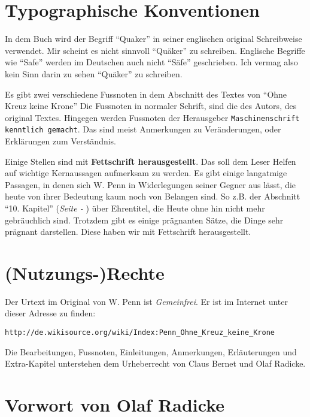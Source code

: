 \chapter{Typographische Konventionen}

In dem Buch wird der Begriff "`Quaker"'  in seiner
englischen original Schreibweise verwendet. Mir scheint es nicht sinnvoll
"`Quäker"' zu schreiben. Englische Begriffe wie "`Safe"' werden im Deutschen
auch nicht "`Säfe"' geschrieben. Ich vermag also kein Sinn darin zu sehen
"`Quäker"' zu schreiben.

\medskip

Es gibt zwei verschiedene Fussnoten in dem Abschnitt des Textes von "`Ohne Kreuz
keine Krone"' Die Fussnoten in normaler Schrift, sind die des Autors, des
original Textes. Hingegen werden Fussnoten der Herausgeber
\texttt{Maschinenschrift kenntlich gemacht}. Das sind meist Anmerkungen zu
Veränderungen, oder Erklärungen zum Verständnis.

\medskip

Einige Stellen sind mit \textbf{Fettschrift herausgestellt}. Das soll dem Leser
Helfen auf wichtige Kernaussagen aufmerksam zu werden. Es gibt einige langatmige
Passagen, in denen sich W. Penn in Widerlegungen seiner Gegner aus lässt, die
heute von ihrer Bedeutung kaum noch von Belangen sind. So z.B. der Abschnitt
"`10. Kapitel"' (\textit{Seite \pageref{kap10} - \pageref{kap10_ende}}) über
Ehrentitel, die Heute ohne hin nicht mehr gebräuchlich sind. Trotzdem gibt es
einige prägnanten Sätze, die Dinge sehr prägnant darstellen. Diese haben wir mit
Fettschrift herausgestellt.

\chapter{(Nutzungs-)Rechte}
Der Urtext im Original von W. Penn ist \textit{Gemeinfrei}. Er ist im Internet
unter dieser Adresse zu finden:

\begin{center}
\texttt{http://de.wikisource.org/wiki/Index:Penn\_Ohne\_Kreuz\_keine\_Krone}
\end{center}

Die Bearbeitungen, Fussnoten, Einleitungen, Anmerkungen, Erläuterungen und
Extra-Kapitel unterstehen dem Urheberrecht von Claus Bernet und Olaf Radicke.


\chapter{Vorwort von Olaf Radicke}

